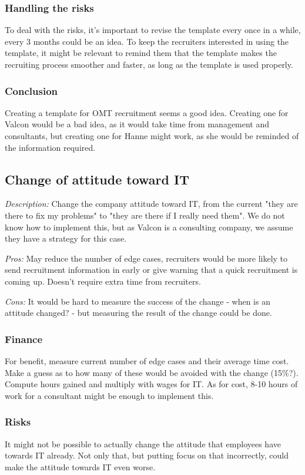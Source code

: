 \subsubsection{Handling the risks}
To deal with the risks, it's important to revise the template every once in a while, every 3 months could be an idea.
To keep the recruiters interested in using the template, it might be relevant to remind them that the template makes the recruiting process smoother and faster, as long as the template is used properly.

\subsubsection{Conclusion} Creating a template for OMT recruitment seems a good idea.
Creating one for Valcon would be a bad idea, as it would take time from management and consultants, but creating one for Hanne might work, as she would be reminded of the information required.

\subsection{Change of attitude toward IT}
\emph{Description:} Change the company attitude toward IT, from the current "they are there to fix my problems" to "they are there if I really need them".
We do not know how to implement this, but as Valcon is a consulting company, we assume they have a strategy for this case.

\emph{Pros:} May reduce the number of edge cases, recruiters would be more likely to send recruitment information in early or give warning that a quick recruitment is coming up.
Doesn't require extra time from recruiters.

\emph{Cons:} It would be hard to measure the success of the change - when is an attitude changed? - but measuring the result of the change could be done.

\subsubsection{Finance} For benefit, measure current number of edge cases and their average time cost.
Make a guess as to how many of these would be avoided with the change (15\%?).
Compute hours gained and multiply with wages for IT.
As for cost, 8-10 hours of work for a consultant might be enough to implement this.

\subsubsection{Risks}
It might not be possible to actually change the attitude that employees have towards IT already. Not only that, but putting focus on that incorrectly, could make the attitude towards IT even worse.

